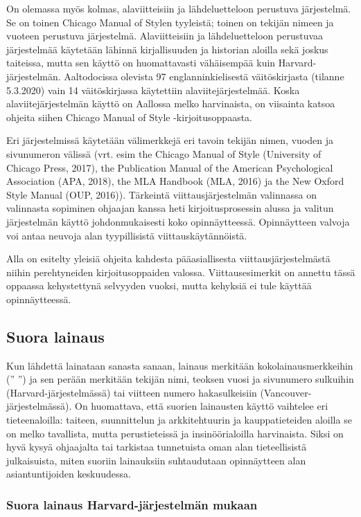 \documentclass[finnish, 12pt, a4paper, elec, utf8, a-2b, online]{aaltothesis}
\begin{document}
On olemassa myös kolmas, alaviitteisiin ja lähdeluetteloon perustuva 
järjestelmä. Se on toinen Chicago Manual of Stylen tyyleistä; toinen on tekijän 
nimeen ja vuoteen perustuva järjestelmä. Alaviitteisiin ja lähdeluetteloon 
perustuvaa järjestelmää käytetään lähinnä kirjallisuuden ja historian aloilla 
sekä joskus taiteissa, mutta sen käyttö on huomattavasti vähäisempää kuin 
Harvard-järjestelmän. Aaltodocissa olevista 97 englanninkielisestä 
väitöskirjasta (tilanne 5.3.2020) vain 14 väitöskirjassa käytettiin 
alaviitejärjestelmää. Koska alaviitejärjestelmän käyttö on Aallossa melko 
harvinaista, on viisainta katsoa ohjeita siihen Chicago Manual of Style 
-kirjoitusoppaasta.

Eri järjestelmissä käytetään välimerkkejä eri tavoin tekijän nimen, vuoden ja 
sivunumeron välissä (vrt. esim the Chicago Manual of Style (University of 
Chicago Press, 2017), the Publication Manual of the American Psychological 
Association (APA, 2018), the MLA Handbook (MLA, 2016) ja the New Oxford Style 
Manual (OUP, 2016)). Tärkeintä viittausjärjestelmän valinnassa on valinnasta 
sopiminen ohjaajan kanssa heti kirjoitusprosessin alussa ja valitun järjestelmän
käyttö johdonmukaisesti koko opinnäytteessä. Opinnäytteen valvoja voi antaa 
neuvoja alan tyypillisistä viittauskäytännöistä.

Alla on esitelty yleisiä ohjeita kahdesta pääasiallisesta viittausjärjestelmästä
niihin perehtyneiden kirjoitusoppaiden valossa. Viittausesimerkit on annettu 
tässä oppaassa kehystettynä selvyyden vuoksi, mutta kehyksiä ei tule käyttää 
opinnäytteessä.


\subsection*{Suora lainaus}

Kun lähdettä lainataan sanasta sanaan, lainaus merkitään kokolainausmerkkeihin 
(” ”) ja sen perään merkitään tekijän nimi, teoksen vuosi ja sivunumero 
sulkuihin (Harvard-järjestelmässä) tai viitteen numero hakasulkeisiin 
(Vancouver-järjestelmässä). On huomattava, että suorien lainausten käyttö 
vaihtelee eri tieteenaloilla: taiteen, suunnittelun ja arkkitehtuurin ja 
kauppatieteiden aloilla se on melko tavallista, mutta perustieteissä ja 
insinöörialoilla harvinaista. Siksi on hyvä kysyä ohjaajalta tai tarkistaa 
tunnetuista oman alan tieteellisistä julkaisuista, miten suoriin lainauksiin 
suhtaudutaan opinnäytteen alan asiantuntijoiden keskuudessa.


\subsubsection*{Suora lainaus Harvard-järjestelmän mukaan}
\end{document}
